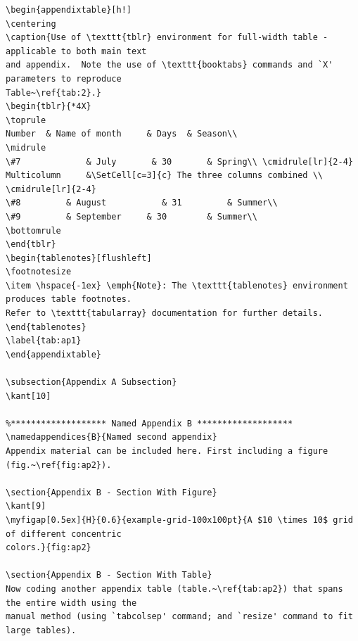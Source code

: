 \documentclass[letterpaper]{refart}
\begin{document}
{\begin{verbatim}
\begin{appendixtable}[h!]
\centering
\caption{Use of \texttt{tblr} environment for full-width table - applicable to both main text 
and appendix.  Note the use of \texttt{booktabs} commands and `X' parameters to reproduce 
Table~\ref{tab:2}.}
\begin{tblr}{*4X}
\toprule
Number 	& Name of month 	& Days 	& Season\\
\midrule
\#7 			& July       & 30 		& Spring\\ \cmidrule[lr]{2-4}
Multicolumn 	&\SetCell[c=3]{c} The three columns combined \\ \cmidrule[lr]{2-4}
\#8 		& August 		   & 31 		& Summer\\
\#9 		& September 	& 30 		& Summer\\
\bottomrule
\end{tblr}
\begin{tablenotes}[flushleft]
\footnotesize
\item \hspace{-1ex} \emph{Note}: The \texttt{tablenotes} environment produces table footnotes.  
Refer to \texttt{tabularray} documentation for further details.  
\end{tablenotes}
\label{tab:ap1}
\end{appendixtable}

\subsection{Appendix A Subsection}
\kant[10]

%******************* Named Appendix B *******************
\namedappendices{B}{Named second appendix}
Appendix material can be included here. First including a figure (fig.~\ref{fig:ap2}).

\section{Appendix B - Section With Figure}
\kant[9]
\myfigap[0.5ex]{H}{0.6}{example-grid-100x100pt}{A $10 \times 10$ grid of different concentric 
colors.}{fig:ap2}

\section{Appendix B - Section With Table}
Now coding another appendix table (table.~\ref{tab:ap2}) that spans the entire width using the 
manual method (using `tabcolsep' command; and `resize' command to fit large tables).


\end{verbatim}}
\end{document}
